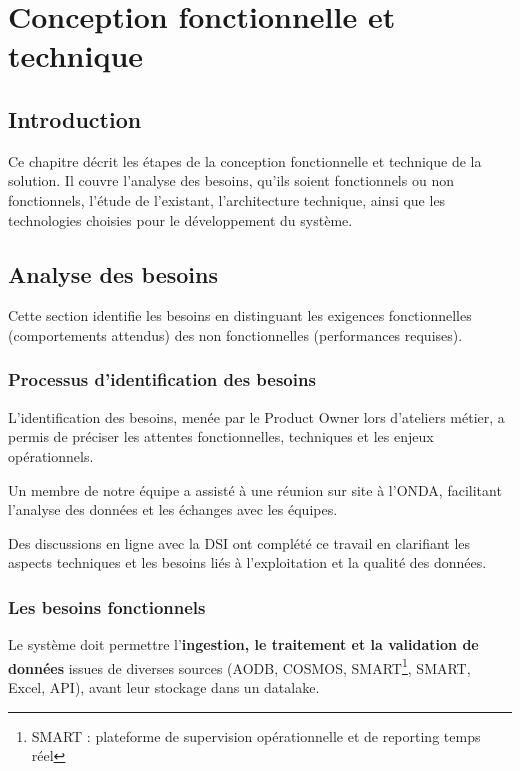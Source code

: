 \chapter{Conception fonctionnelle et technique}
\vspace{-1.5em}
\chaptertoc
\vspace{-2.5em}
\section{Introduction}

Ce chapitre décrit les étapes de la conception fonctionnelle et technique de la solution. Il couvre l’analyse des besoins, qu’ils soient fonctionnels ou non fonctionnels, l’étude de l’existant, l’architecture technique, ainsi que les technologies choisies pour le développement du système.

\vspace{-1.2em}
\section{Analyse des besoins}

Cette section identifie les besoins en distinguant les exigences fonctionnelles (comportements attendus) des non fonctionnelles (performances requises).
\vspace{-1.2em}
\subsection{Processus d’identification des besoins}
L’identification des besoins, menée par le Product Owner lors d’ateliers métier, a permis de préciser les attentes fonctionnelles, techniques et les enjeux opérationnels.

Un membre de notre équipe a assisté à une réunion sur site à l’\ac{ONDA}, facilitant l’analyse des données et les échanges avec les équipes.

Des discussions en ligne avec la DSI ont complété ce travail en clarifiant les aspects techniques et les besoins liés à l’exploitation et la qualité des données.
\vspace{-1.2em}

\subsection{Les besoins fonctionnels}

Le système doit permettre l’\textbf{ingestion, le traitement et la validation de données} issues de diverses sources (AODB, COSMOS, SMART\footnote{SMART : plateforme de supervision opérationnelle et de reporting temps réel}, SMART, Excel, API), avant leur stockage dans un datalake.

